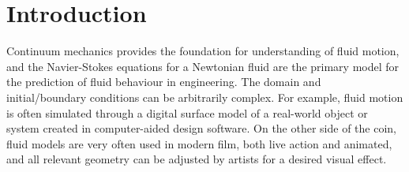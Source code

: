 
\vskip -0.2in %
\section{Introduction}

Continuum mechanics provides the foundation for understanding of fluid motion, and the Navier-Stokes equations for
a Newtonian fluid are the primary model for the prediction of fluid behaviour in engineering.
The domain and initial/boundary conditions can be arbitrarily complex. For example, fluid motion is often simulated
through a digital surface model of a real-world object or system created in computer-aided design software.
On the other side of the coin, fluid models are very often used in modern film, both live action and animated,
and all relevant geometry can be adjusted by artists for a desired visual effect.
\captionsetup[subfigure]{labelformat=empty}
